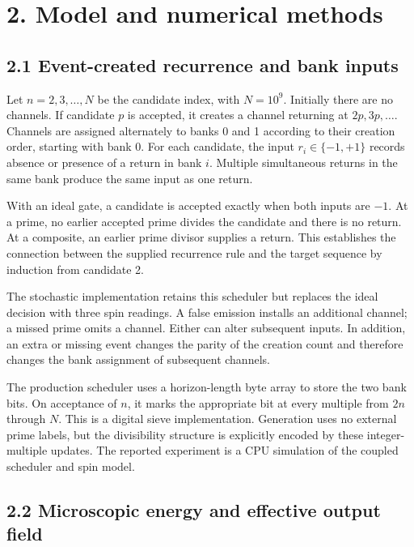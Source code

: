 \documentclass[
  11pt,
]{article}
\begin{document}
\section{2. Model and numerical
methods}\label{model-and-numerical-methods}

\subsection{2.1 Event-created recurrence and bank
inputs}\label{event-created-recurrence-and-bank-inputs}

Let \(n=2,3,\ldots,N\) be the candidate index, with \(N=10^9\).
Initially there are no channels. If candidate \(p\) is accepted, it
creates a channel returning at \(2p,3p,\ldots\). Channels are assigned
alternately to banks 0 and 1 according to their creation order, starting
with bank 0. For each candidate, the input \(r_i\in\{-1,+1\}\) records
absence or presence of a return in bank \(i\). Multiple simultaneous
returns in the same bank produce the same input as one return.

With an ideal gate, a candidate is accepted exactly when both inputs are
\(-1\). At a prime, no earlier accepted prime divides the candidate and
there is no return. At a composite, an earlier prime divisor supplies a
return. This establishes the connection between the supplied recurrence
rule and the target sequence by induction from candidate 2.

The stochastic implementation retains this scheduler but replaces the
ideal decision with three spin readings. A false emission installs an
additional channel; a missed prime omits a channel. Either can alter
subsequent inputs. In addition, an extra or missing event changes the
parity of the creation count and therefore changes the bank assignment
of subsequent channels.

The production scheduler uses a horizon-length byte array to store the
two bank bits. On acceptance of \(n\), it marks the appropriate bit at
every multiple from \(2n\) through \(N\). This is a digital sieve
implementation. Generation uses no external prime labels, but the
divisibility structure is explicitly encoded by these integer-multiple
updates. The reported experiment is a CPU simulation of the coupled
scheduler and spin model.

\subsection{2.2 Microscopic energy and effective output
field}\label{microscopic-energy-and-effective-output-field}
\end{document}
